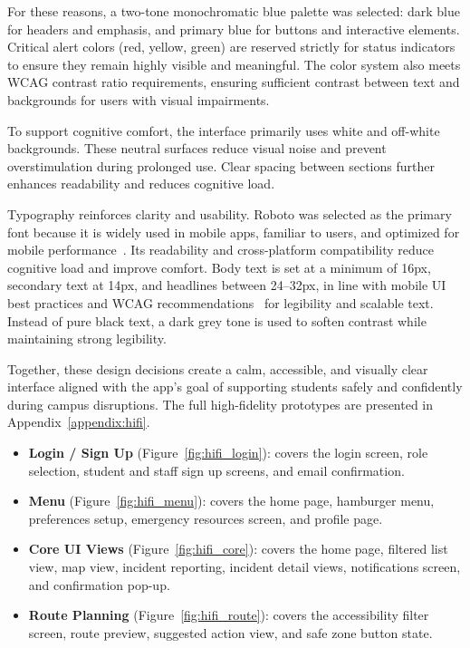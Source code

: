 \documentclass[sigconf]{acmart}
\begin{document}
For these reasons, a two-tone monochromatic blue palette was selected: dark blue for headers and emphasis, and primary blue for buttons and interactive elements. Critical alert colors (red, yellow, green) are reserved strictly for status indicators to ensure they remain highly visible and meaningful. The color system also meets WCAG contrast ratio requirements, ensuring sufficient contrast between text and backgrounds for users with visual impairments.
 
To support cognitive comfort, the interface primarily uses white and off-white backgrounds. These neutral surfaces reduce visual noise and prevent overstimulation during prolonged use. Clear spacing between sections further enhances readability and reduces cognitive load.
 
Typography reinforces clarity and usability. Roboto was selected as the primary font because it is widely used in mobile apps, familiar to users, and optimized for mobile performance~\cite{google2014roboto}. Its readability and cross-platform compatibility reduce cognitive load and improve comfort. Body text is set at a minimum of 16px, secondary text at 14px, and headlines between 24--32px, in line with mobile UI best practices and WCAG recommendations~\cite{wcag21} for legibility and scalable text. Instead of pure black text, a dark grey tone is used to soften contrast while maintaining strong legibility.
 
Together, these design decisions create a calm, accessible, and visually clear interface aligned with the app's goal of supporting students safely and confidently during campus disruptions. The full high-fidelity prototypes are presented in Appendix~\ref{appendix:hifi}.
 
\begin{itemize}[leftmargin=*, labelindent=0pt, itemsep=4pt]
    \item \textbf{Login / Sign Up} (Figure~\ref{fig:hifi_login}): covers the login screen, role selection, student and staff sign up screens, and email confirmation.
    \item \textbf{Menu} (Figure~\ref{fig:hifi_menu}): covers the home page, hamburger menu, preferences setup, emergency resources screen, and profile page.
    \item \textbf{Core UI Views} (Figure~\ref{fig:hifi_core}): covers the home page, filtered list view, map view, incident reporting, incident detail views, notifications screen, and confirmation pop-up.
    \item \textbf{Route Planning} (Figure~\ref{fig:hifi_route}): covers the accessibility filter screen, route preview, suggested action view, and safe zone button state.
\end{itemize}
\end{document}
